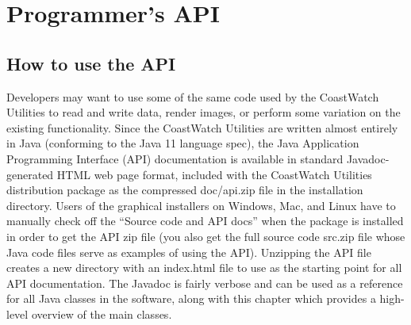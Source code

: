 \chapter{Programmer's API}
\label{api}

\section{How to use the API}

Developers may want to use some of the same code used by the
CoastWatch Utilities to read and write data, render images, or
perform some variation on the existing functionality.  Since the
CoastWatch Utilities are written almost entirely in Java
(conforming to the Java 11 language spec), the Java Application
Programming Interface (API) documentation is available in
standard Javadoc-generated HTML web page format, included with the
CoastWatch Utilities distribution package as the compressed
{\file doc/api.zip} file in the installation directory.  Users of
the graphical installers on Windows, Mac, and Linux
have to manually check off the ``Source code and API docs'' when
the package is installed in order to get the API zip file (you
also get the full source code {\file src.zip} file whose Java code
files serve as examples of using the API).  Unzipping the API
file creates a new directory with an {\file index.html} file to
use as the starting point for all API documentation.  The Javadoc
is fairly verbose and can be used as a reference for all Java
classes in the software, along with this chapter which provides a
high-level overview of the main classes.


